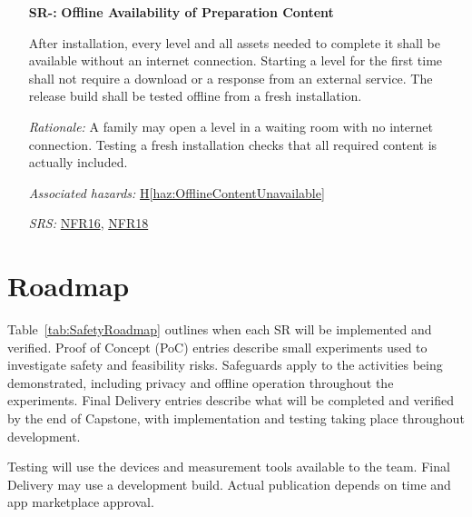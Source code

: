 \documentclass{article}
\newcounter{hazard}
\newcommand{\hazref}[1]{\hyperref[haz:#1]{H\ref*{haz:#1}}}
\newcounter{sr}
\newcommand{\srdef}[1]{\refstepcounter{sr}\label{sr:#1}\textbf{SR-\thesr:}}
\newcommand{\srsurl}{https://team-hindsight.github.io/ophthamology-game/SRS-IEEE/SRS.pdf}
\newcommand{\srsfrref}[2]{\href{\srsurl\#nameddest=#1}{FR#2}}
\newcommand{\srsnfrref}[2]{\href{\srsurl\#nameddest=#1}{NFR#2}}
\begin{document}
\begin{itemize}[leftmargin=1.5cm, labelwidth=1.3cm, labelsep=0.2cm,
  align=left, itemsep=1.2em, parsep=0.6em]
During a preparation activity, narration and its visual
demonstration shall describe the same step and
remain synchronized. After an interruption, both shall
resume from the same point.

\textit{Rationale:}
An accurate script and an accurate animation can still
teach the wrong thing if they are played together at the
wrong time. The child needs to hear the explanation that
matches what they are seeing, including after an interruption.

\textit{Associated hazards:}
\hazref{AudioVisualMismatch}

\textit{SRS:} \srsfrref{FR_Suspend}{24}; \srsnfrref{NFR_AVSync}{12}

\item[\srdef{OfflinePreparation}]
\textbf{Offline Availability of Preparation Content}

After installation, every level and all assets
needed to complete it shall be available without an internet
connection. Starting a level for the first time shall not
require a download or a response from an external service.
The release build shall be tested offline from a fresh
installation.

\textit{Rationale:}
A family may open a level in a waiting room with no
internet connection. Testing a fresh installation checks that all
required content is actually included.

\textit{Associated hazards:}
\hazref{OfflineContentUnavailable}

\textit{SRS:} \srsnfrref{NFR_Offline}{16}, \srsnfrref{NFR_Installability}{18}

\end{itemize}

\section{Roadmap}
\label{sec_Roadmap}

Table~\ref{tab:SafetyRoadmap} outlines when each SR will be
implemented and verified. Proof of Concept (PoC) entries describe small experiments used to investigate
safety and feasibility risks. Safeguards apply to the activities being
demonstrated, including privacy and offline operation throughout the experiments.
Final Delivery entries describe what will be completed and verified by the end
of Capstone, with implementation and testing taking place throughout development.

Testing will use the devices and measurement tools available to the team. Final Delivery may use a
development build. Actual publication depends on time and app marketplace approval.
\end{document}
